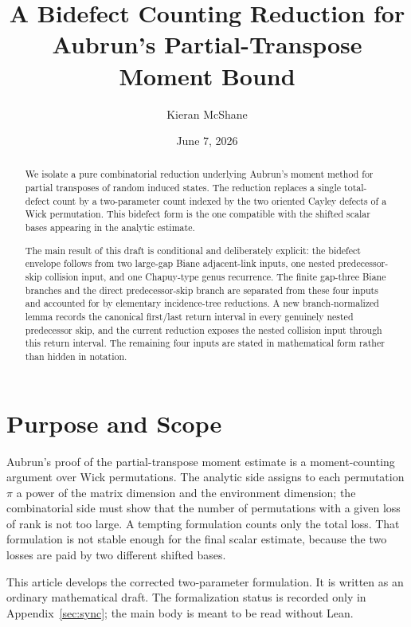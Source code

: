 \documentclass[11pt]{article}
\title{A Bidefect Counting Reduction for Aubrun's Partial-Transpose Moment Bound}
\author{Kieran McShane}
\date{June 7, 2026}
\theoremstyle{plain}
\theoremstyle{definition}
\theoremstyle{remark}
\newcommand{\p}{\pi}
\begin{document}
\maketitle

\begin{abstract}
We isolate a pure combinatorial reduction underlying Aubrun's moment method
for partial transposes of random induced states.  The reduction replaces a
single total-defect count by a two-parameter count indexed by the two oriented
Cayley defects of a Wick permutation.  This bidefect form is the one compatible
with the shifted scalar bases appearing in the analytic estimate.

The main result of this draft is conditional and deliberately explicit: the
bidefect envelope follows from two large-gap Biane adjacent-link inputs, one
nested predecessor-skip collision input, and one Chapuy-type genus recurrence.
The finite gap-three Biane branches and the direct predecessor-skip branch are
separated from these four inputs and accounted for by elementary
incidence-tree reductions.  A new branch-normalized lemma records the
canonical first/last return interval in every genuinely nested predecessor
skip, and the current reduction exposes the nested collision input through
this return interval.  The remaining four inputs are stated in mathematical
form rather than hidden in notation.
\end{abstract}

\tableofcontents

\section{Purpose and Scope}

Aubrun's proof of the partial-transpose moment estimate is a moment-counting
argument over Wick permutations.  The analytic side assigns to each permutation
\(\p\) a power of the matrix dimension and the environment dimension; the
combinatorial side must show that the number of permutations with a given loss
of rank is not too large.  A tempting formulation counts only the total loss.
That formulation is not stable enough for the final scalar estimate, because
the two losses are paid by two different shifted bases.

This article develops the corrected two-parameter formulation.  It is written
as an ordinary mathematical draft.  The formalization status is recorded only
in Appendix~\ref{sec:sync}; the main body is meant to be read without Lean.
\end{document}
